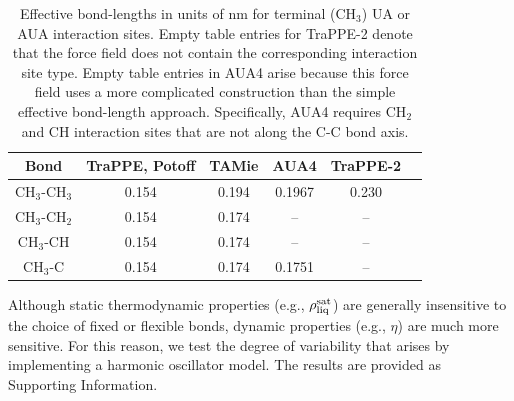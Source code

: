 \documentclass[preprint,review,12pt]{elsarticle}
\begin{document}
	\begin{table}[h!]
		\caption{Effective bond-lengths in units of nm for terminal (CH$_3$) UA or AUA interaction sites. Empty table entries for TraPPE-2 denote that the force field does not contain the corresponding interaction site type. Empty table entries in AUA4 arise because this force field uses a more complicated construction than the simple effective bond-length approach. Specifically, AUA4 requires CH$_2$ and CH interaction sites that are not along the C-C bond axis.} \label{tab:bond-lengths}
		\begin{center}
			\begin{tabular}{|c|c|c|c|c|c|}
				\hline
				Bond & TraPPE, Potoff & TAMie & AUA4 & TraPPE-2 \\ \hline
				CH$_3$-CH$_3$ & 0.154 & 0.194 & 0.1967 & 0.230 \\ 
				CH$_3$-CH$_2$ & 0.154 & 0.174 & -- & -- \\ 
				CH$_3$-CH & 0.154 & 0.174 & -- & -- \\
				CH$_3$-C & 0.154 & 0.174 & 0.1751 & -- \\
				\hline
			\end{tabular}
		\end{center} 
	\end{table}
%

    Although static thermodynamic properties (e.g., $\rho_{\rm liq}^{\rm sat}$) are generally insensitive to the choice of fixed or flexible bonds, dynamic properties (e.g., $\eta$) are much more sensitive. For this reason, we test the degree of variability that arises by implementing a harmonic oscillator model. The results are provided as Supporting Information. 
    
\end{document}
